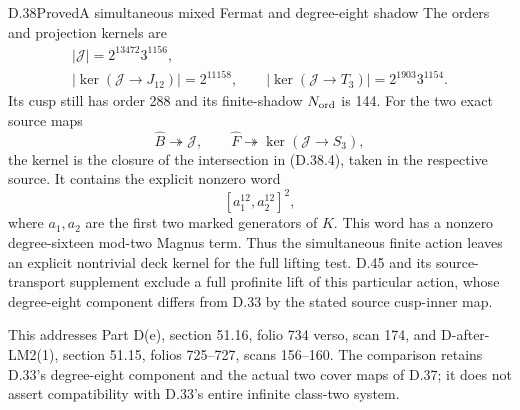 \begin{statement}{D.38}{Proved}{A simultaneous mixed Fermat and degree-eight shadow}
The orders and projection kernels are
\[
 \begin{gathered}
 |\mathcal J|=2^{13472}3^{1156},\\
 |\ker(\mathcal J\to J_{12})|=2^{11158},\qquad
 |\ker(\mathcal J\to T_3)|=2^{1903}3^{1154}.
 \end{gathered}                                           \tag{D.38.6}
\]
Its cusp still has order 288 and its finite-shadow
$N_{\rm ord}$ is 144. For the two exact source maps
\[
 \widehat B\twoheadrightarrow\mathcal J,\qquad
 \widehat F\twoheadrightarrow\ker(\mathcal J\to S_3),
\]
the kernel is the closure of the intersection in
(D.38.4), taken in the respective source. It contains the explicit
nonzero word
\[
 [a_1^{12},a_2^{12}]^2,                                  \tag{D.38.7}
\]
where $a_1,a_2$ are the first two marked generators of $K$.
This word has a nonzero degree-sixteen mod-two Magnus
term. Thus the simultaneous finite action leaves an
explicit nontrivial deck kernel for the full lifting
test. D.45 and its source-transport supplement exclude a full
profinite lift of this particular action, whose degree-eight
component differs from D.33 by the stated source cusp-inner map.

This addresses Part D(e), section 51.16, folio 734 verso,
scan 174, and D-after-LM2(1), section 51.15, folios
725--727, scans 156--160. The comparison retains D.33's
degree-eight component and the actual two cover maps of
D.37; it does not assert compatibility with D.33's entire
infinite class-two system.
\end{statement}
